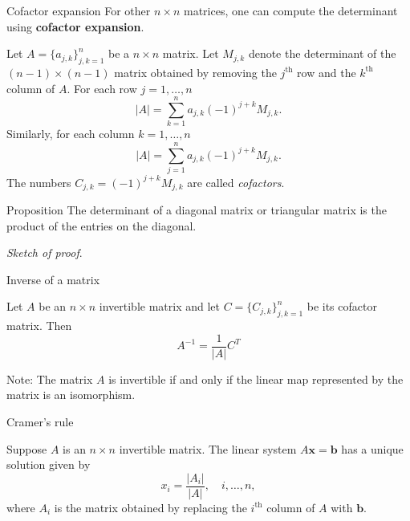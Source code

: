 \documentclass [aspectratio=169]{beamer}
\newcommand{\bx}{{\mathbf{x}}}
\newcommand{\inv}{{-1}}
\begin{document}
\begin{frame}{Cofactor expansion}
For other $n \times n$ matrices, one can compute the determinant using \textbf{\textcolor{deptoran}{cofactor expansion}}.

\begin{definition}
Let $A = \{ a_{j,k}\}_{j,k=1}^n$ be a $n\times n$ matrix. Let $M_{j,k}$ denote the determinant of the $(n-1) \times (n-1)$ matrix obtained by removing the $j^\text{th}$ row and the $k^\text{th}$ column of $A$. For each row $j=1,\ldots,n$
\begin{equation*}
    |A| = \sum_{k=1}^n a_{j,k} (-1)^{j+k} M_{j,k}.
\end{equation*}
Similarly, for each column $k=1,\ldots,n$
\begin{equation*}
    |A| = \sum_{j=1}^n a_{j,k} (-1)^{j+k} M_{j,k}.
\end{equation*}
The numbers $C_{j,k}=(-1)^{j+k} M_{j,k}$ are called \emph{cofactors}.
\end{definition}
\end{frame}


\begin{frame}
\begin{exampleblock}{Proposition}
The determinant of a diagonal matrix or triangular matrix is the product of the entries on the diagonal.
\end{exampleblock}
\textit{Sketch of proof}.
\vspace{4cm}


\end{frame}


\begin{frame}{Inverse of a matrix}
\begin{theorem}
Let $A$ be an $n \times n$ invertible matrix and let $C=\{C_{j,k}\}_{j,k=1}^n$ be its cofactor matrix. Then
\begin{equation*}
    A^\inv = \frac{1}{|A|} C^T
\end{equation*}
\end{theorem}

\vspace{1em}

Note: The matrix $A$ is invertible if and only if the linear map represented by the matrix is an isomorphism.
\end{frame}

\begin{frame}{Cramer's rule}
\begin{corollary}
Suppose $A$ is an $n \times n$ invertible matrix. The linear system $A\bx = \mathbf{b}$ has a unique solution given by
\begin{equation*}
    x_i = \frac{|A_i|}{|A|}, \quad i, \ldots, n,
\end{equation*}
where $A_i$ is the matrix obtained by replacing the $i^\text{th}$ column of $A$ with $\mathbf{b}$.
\end{corollary}
\end{frame}
\end{document}
